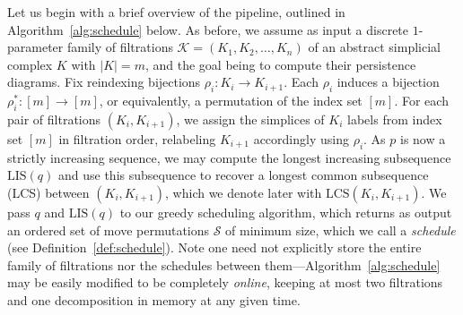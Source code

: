 \documentclass[sn-mathphys]{sn-jnl}
\begin{document}
Let us begin with a brief overview of the pipeline, outlined in Algorithm~\ref{alg:schedule} below.
As before, we assume as input  a discrete $1$-parameter family of filtrations $\mathcal{K} = (K_1, K_2, \dots, K_n)$ of an abstract simplicial complex $K$ with $\lvert K \rvert =m$, and the goal being to compute their persistence diagrams.
Fix reindexing bijections $\rho_i : K_i \to K_{i+1}$. 
Each $\rho_i$ induces a bijection $\rho_i^\ast : [m] \to [m]$, or equivalently, a permutation of the index set $[m]$. For each pair of filtrations $(K_i, K_{i+1})$, we assign the simplices of $K_i$ labels from index set $[m]$ in filtration order, relabeling $K_{i+1}$ accordingly using $\rho_i$. 
As $p$ is now a strictly increasing sequence, we may compute the longest increasing subsequence $\mathrm{LIS}(q)$ and use this subsequence to recover a longest common subsequence (LCS) between $(K_i, K_{i+1})$, which we denote later with $\mathrm{LCS}(K_i, K_{i+1})$. We pass $q$ and $\mathrm{LIS}(q)$ to our greedy scheduling algorithm, which returns as output an ordered set of move permutations  $\mathcal{S}$ of minimum size, which we call a \emph{schedule} (see Definition~\ref{def:schedule}).
Note one need not explicitly store the entire family of filtrations nor the schedules between them---Algorithm~\ref{alg:schedule} may be easily modified to be completely \emph{online}, keeping at most two filtrations and one decomposition in memory at any given time. 
\end{document}
